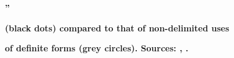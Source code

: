 \begin{stylecaption}

\end{stylecaption}

\begin{figure}[h]

\begin{minipage}{6.5835in}

\bfseries
”

\end{minipage}

\end{figure}

\begin{stylecaption}

\end{stylecaption}

\begin{figure}[h]

\begin{minipage}{6.5835in}

\bfseries
 (black dots) compared to that of non-delimited uses

\end{minipage}

\end{figure}

\begin{stylecaption}

\end{stylecaption}

\begin{figure}[h]

\begin{minipage}{6.5835in}

\end{minipage}

\end{figure}

\begin{stylecaption}

\end{stylecaption}

\begin{figure}[h]

\begin{minipage}{6.5835in}

\bfseries
 of definite forms (grey circles). Sources: \citet{Tarkiainen1990}, \citet{Broberg1980}.

\end{minipage}

\end{figure}

